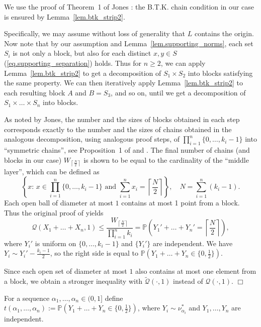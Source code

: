 \documentclass{article}
\newenvironment{proof}{\noindent{\bf Proof}}{\hspace*{\fill}$\Box$}
\newcommand{\pr}{\mathbb P}
\newcommand{\conc}{\mathcal{Q}}
\newcommand{\concdiam}{\tilde{\mathcal{Q}}}
\newcommand\nuopt[1]{\nu_{#1}^*}
\begin{document}
\begin{proof}
    We use the proof of Theorem~1 of Jones \cite{jones}:
the B.T.K. chain condition in our case is ensured by Lemma~\ref{lem.btk_strip2}.


    Specifically, we may assume without loss of generality that $L$ contains the origin. Now note that by our assumption and Lemma~\ref{lem.supporting_norms},
    each set $S_i$ is not only a block, but also for each distinct $x,y \in S$ (\ref{eq.supporting_separation})
    holds. Thus for $n \ge 2$, we can apply Lemma~\ref{lem.btk_strip2} to get a decomposition
    of $S_1 \times S_2$ into blocks satisfying the same property. 
    We can then iteratively apply Lemma~\ref{lem.btk_strip2} to each resulting block $A$ and $B=S_3$,
    and so on, until we get a decomposition of $S_1 \times \dots \times S_n$ into blocks.

    As noted by Jones, the number and the sizes of blocks obtained in each step corresponds exactly
    to the number and the sizes of chains obtained in the analogous decomposition, using analogous proof steps, of $\prod_{i=1}^n \{0, \dots, k_i-1\}$ into ``symmetric chains'', see Proposition~1 of \cite{jones} and \cite{btk}.
    The final number of chains (and blocks in our case) $W_{\left \lceil \frac N 2  \right \rceil}$  is shown to be
    equal to the cardinality of the ``middle layer'', which can be defined as
    \[
       \left \{x: \, x \in \prod_{i=1}^n \{0, \dots, k_i-1\} \mbox{ and } \sum_{i=1}^n x_i = \left \lceil \frac N 2  \right \rceil \right \}, \quad N = \sum_{i=1}^n (k_i - 1).
    \]
    Each open ball of diameter at most $1$ contains at most 1 point from a block. Thus the original proof of \cite{jones} yields 
    \[
        \conc(X_1 + \dots + X_n, 1) \le \frac { W_{\left \lceil \frac N 2  \right \rceil}} {\prod_{i=1}^n k_i} = \pr(Y_1' + \dots + Y_n' = \left \lceil \frac N 2 \right \rceil),
    \]
    where $Y_i'$ is uniform on $\{0, \dots, k_i-1\}$ and $\{Y_i'\}$ are independent.
We have $Y_i \sim Y_i' - \frac {{k_i}-1} 2$,
    so the right side is equal to $\pr(Y_1 + \dots + Y_n \in \{0, \frac 1 2\})$.

    Since each open set of diameter at most $1$ also contains at most one element 
from a block, we obtain
    a stronger inequality with $\concdiam(\cdot, 1)$ instead of $\conc(\cdot,1)$.
\end{proof}

\medskip




For a sequence $\alpha_1, \dots, \alpha_n \in (0,1]$ define $t(\alpha_1, \dots, \alpha_n):=\pr(Y_1+\dots+Y_n \in \{0, \frac 1 2\})$, where $Y_i \sim \nuopt {\alpha_i}$ and $Y_1, \dots, Y_n$ are independent. 
\end{document}
